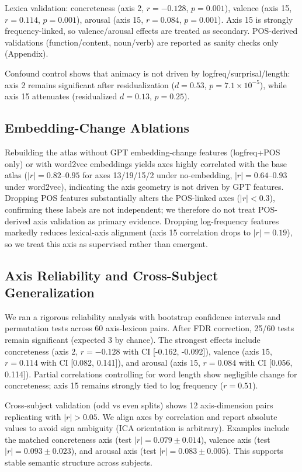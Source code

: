 \documentclass[
]{article}
\begin{document}
Lexica validation: concreteness (axis 2, \(r=-0.128\), \(p=0.001\)),
valence (axis 15, \(r=0.114\), \(p=0.001\)), arousal (axis 15,
\(r=0.084\), \(p=0.001\)). Axis 15 is strongly frequency-linked, so
valence/arousal effects are treated as secondary. POS-derived
validations (function/content, noun/verb) are reported as sanity checks
only (Appendix).

Confound control shows that animacy is not driven by
logfreq/surprisal/length: axis 2 remains significant after
residualization (\(d=0.53\), \(p=7.1\times10^{-5}\)), while axis 15
attenuates (residualized \(d=0.13\), \(p=0.25\)).

\subsection{Embedding-Change
Ablations}\label{embedding-change-ablations}

Rebuilding the atlas without GPT embedding-change features (logfreq+POS
only) or with word2vec embeddings yields axes highly correlated with the
base atlas (\(|r|=0.82–0.95\) for axes 13/19/15/2 under no-embedding,
\(|r|=0.64–0.93\) under word2vec), indicating the axis geometry is not
driven by GPT features. Dropping POS features substantially alters the
POS-linked axes (\(|r|<0.3\)), confirming these labels are not
independent; we therefore do not treat POS-derived axis validation as
primary evidence. Dropping log-frequency features markedly reduces
lexical-axis alignment (axis 15 correlation drops to \(|r|=0.19\)), so
we treat this axis as supervised rather than emergent.

\subsection{Axis Reliability and Cross-Subject
Generalization}\label{axis-reliability-and-cross-subject-generalization}

We ran a rigorous reliability analysis with bootstrap confidence
intervals and permutation tests across 60 axis-lexicon pairs. After FDR
correction, 25/60 tests remain significant (expected 3 by chance). The
strongest effects include concreteness (axis 2, \(r=-0.128\) with CI
{[}-0.162, -0.092{]}), valence (axis 15, \(r=0.114\) with CI {[}0.082,
0.141{]}), and arousal (axis 15, \(r=0.084\) with CI {[}0.056,
0.114{]}). Partial correlations controlling for word length show
negligible change for concreteness; axis 15 remains strongly tied to log
frequency (\(r=0.51\)).

Cross-subject validation (odd vs even splits) shows 12 axis-dimension
pairs replicating with \(|r|>0.05\). We align axes by correlation and
report absolute values to avoid sign ambiguity (ICA orientation is
arbitrary). Examples include the matched concreteness axis (test
\(|r|=0.079 \pm 0.014\)), valence axis (test \(|r|=0.093 \pm 0.023\)),
and arousal axis (test \(|r|=0.083 \pm 0.005\)). This supports stable
semantic structure across subjects.
\end{document}
